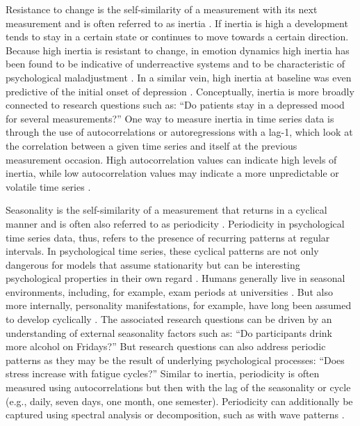 \documentclass[man, 12pt, a4paper, mask, floatsintext]{apa7}
\theoremstyle{break}
\theoremstyle{plain}
\begin{document}
Resistance to change is the self-similarity of a measurement with its next measurement and is often referred to as inertia \citep{kuppens2010}. If inertia is high a development tends to stay in a certain state or continues to move towards a certain direction. Because high inertia is resistant to change, in emotion dynamics high inertia has been found to be indicative of underreactive systems and to be characteristic of psychological maladjustment \citep{kuppens2010}. In a similar vein, high inertia at baseline was even predictive of the initial onset of depression \citep{kuppens2012}. Conceptually, inertia is more broadly connected to research questions such as: ``Do patients stay in a depressed mood for several measurements?'' One way to measure inertia in time series data is through the use of autocorrelations or autoregressions with a lag-1, which look at the correlation between a given time series and itself at the previous measurement occasion. High autocorrelation values can indicate high levels of inertia, while low autocorrelation values may indicate a more unpredictable or volatile time series \citep{dejonckheere2019}.

Seasonality is the self-similarity of a measurement that returns in a cyclical manner and is often also referred to as periodicity \citep{gregson1983}. Periodicity in psychological time series data, thus, refers to the presence of recurring patterns at regular intervals. In psychological time series, these cyclical patterns are not only dangerous for models that assume stationarity \citep{beal2015} but can be interesting psychological properties in their own regard \citep{epskamp2018, schmittmann2013}. Humans generally live in seasonal environments, including, for example, exam periods at universities \citep{fuller2003}. But also more internally, personality manifestations, for example, have long been assumed to develop cyclically \citep{cattell1957}. The associated research questions can be driven by an understanding of external seasonality factors such as: ``Do participants drink more alcohol on Fridays?'' But research questions can also address periodic patterns as they may be the result of underlying psychological processes: ``Does stress increase with fatigue cycles?'' Similar to inertia, periodicity is often measured using autocorrelations but then with the lag of the seasonality or cycle (e.g., daily, seven days, one month, one semester). Periodicity can additionally be captured using spectral analysis or decomposition, such as with wave patterns \citep[e.g., fourier or wavelet transformation; e.g.,][]{mayor2022}.
\end{document}
